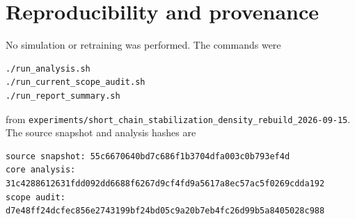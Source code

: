 \documentclass[10pt]{article}
\begin{document}
\section{Reproducibility and provenance}

No simulation or retraining was performed.  The commands were
\begin{verbatim}
./run_analysis.sh
./run_current_scope_audit.sh
./run_report_summary.sh
\end{verbatim}
from
\texttt{experiments/short\_chain\_stabilization\_density\_rebuild\_2026-09-15}.
The source snapshot and analysis hashes are
\begingroup\scriptsize
\begin{verbatim}
source snapshot: 55c6670640bd7c686f1b3704dfa003c0b793ef4d
core analysis:   31c4288612631fdd092dd6688f6267d9cf4fd9a5617a8ec57ac5f0269cdda192
scope audit:     d7e48ff24dcfec856e2743199bf24bd05c9a20b7eb4fc26d99b5a8405028c988
\end{verbatim}
\endgroup
\end{document}
